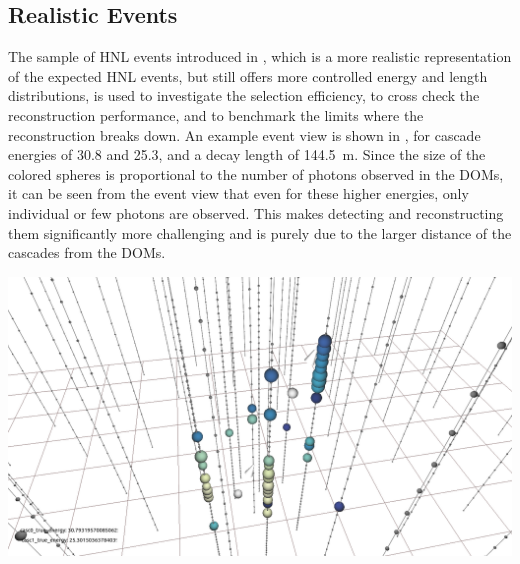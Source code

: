 \subsection{Realistic Events}

The sample of HNL events introduced in , which is a more realistic representation of the expected HNL events, but still offers more controlled energy and length distributions, is used to investigate the selection efficiency, to cross check the reconstruction performance, and to benchmark the limits where the reconstruction breaks down. An example event view is shown in , for cascade energies of \SI{30.8}{\gev} and \SI{25.3}{\gev}, and a decay length of \SI{144.5}{\meter}. Since the size of the colored spheres is proportional to the number of photons observed in the DOMs, it can be seen from the event view that even for these higher energies, only individual or few photons are observed. This makes detecting and reconstructing them significantly more challenging and is purely due to the larger distance of the cascades from the DOMs.

\begin{marginfigure}
    \centering
    \includegraphics[trim=230 45 230 65, clip]{figures/model_independent_simulation/diagonal_e0_30.8_e1_25.3_v0.png}
    \caption[Event view of a realistic double cascade event]{Event view of a realistic double cascade event, with cascade energies of \SI{30.8}{\gev} and \SI{25.3}{\gev}, and a decay length of \SI{144.5}{\meter}. The colored spheres show the DOMs that have observed light, where the size is proportional to the number of observed photons and the color indicates the time (yellow is early, blue is late). The strings are shown as black lines, with small spheres indicating the DOM positions, and the true cascade vertices and directions are shown as white spheres with white arrows.}
\end{marginfigure}

